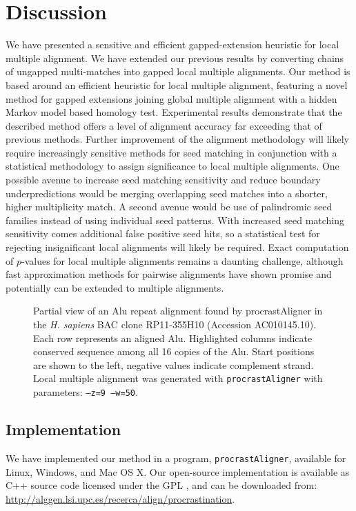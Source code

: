 \documentclass{llncs}
\begin{document}
\section{Discussion}
We have presented a sensitive and efficient gapped-extension heuristic for local
multiple alignment. We have extended our previous results by
converting chains of ungapped multi-matches into gapped local multiple
alignments. Our method is based around an efficient heuristic for
local multiple alignment, featuring a novel method for gapped
extensions joining global multiple alignment with a hidden Markov
model based homology test.  Experimental results demonstrate that the
described method offers a level of alignment accuracy far exceeding
that of previous methods.  Further improvement of the alignment
methodology will likely require increasingly sensitive methods for
seed matching in conjunction with a statistical methodology to assign
significance to local multiple alignments.  One possible avenue to
increase seed matching sensitivity and reduce boundary
underpredictions would be merging overlapping seed matches into a
shorter, higher multiplicity match.  A second avenue would be use of
palindromic seed families instead of using individual seed
patterns. With increased seed matching sensitivity comes additional
false positive seed hits, so a statistical test for rejecting
insignificant local alignments will likely be required.  Exact
computation of $p$-values for local multiple alignments remains a
daunting challenge, although fast approximation methods for pairwise
alignments have shown promise\cite{repseek} and potentially can be
extended to multiple alignments\cite{ref-related1,Prakash2005}.
\begin{figure}[t!]
\centering {}
\vspace{-1.0cm}
\caption{Partial view of an Alu repeat alignment found by procrastAligner in the \emph{H. sapiens} BAC
clone RP11-355H10 (Accession AC010145.10). Each row represents an
aligned Alu. Highlighted columns indicate conserved sequence among all
16 copies of the Alu. Start positions are shown to the left, negative
values indicate complement strand.  Local multiple alignment was
generated with \texttt{procrastAligner} with parameters: \texttt{--z=9
--w=50}.  }
\label{fig-align}
\end{figure}
\subsection{Implementation}
We have implemented our method in a program, \texttt{procrastAligner},
available for Linux, Windows, and Mac OS X. Our open-source
implementation is available as C++ source code licensed under the GPL , and can be downloaded from: \\
\url{http://alggen.lsi.upc.es/recerca/align/procrastination}.
\end{document}
